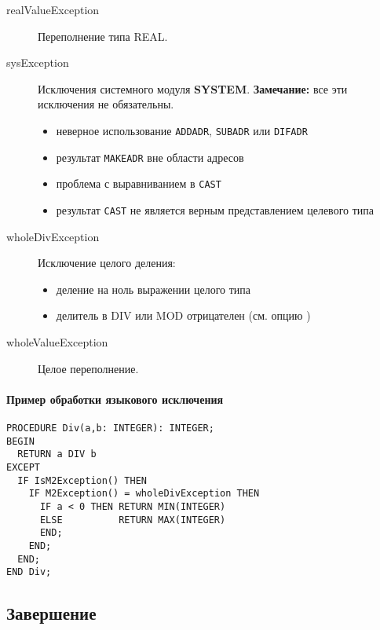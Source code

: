 \begin{description}
\item[realValueException] \mbox{}

Переполнение типа REAL.

\item[sysException] \mbox{}

        Исключения системного модуля {\bf SYSTEM}.
        {\bf Замечание:} все эти исключения не обязательны.
        \begin{itemize}
        \item неверное использование {\tt ADDADR}, {\tt SUBADR} или {\tt DIFADR}
        \item результат {\tt MAKEADR} вне области адресов
        \item проблема с выравниванием в {\tt CAST}
        \item результат {\tt CAST} не является верным представлением 
целевого типа
        \end{itemize}

\item[wholeDivException] \mbox{}

Исключение целого деления:
        \begin{itemize}
        \item деление на ноль выражении целого типа
        \item делитель в DIV или MOD отрицателен
              (см. опцию )
        \end{itemize}

\item[wholeValueException] \mbox{}

Целое переполнение.
\end{description}

\paragraph{Пример обработки языкового исключения}
\begin{verbatim}
PROCEDURE Div(a,b: INTEGER): INTEGER;
BEGIN
  RETURN a DIV b
EXCEPT
  IF IsM2Exception() THEN
    IF M2Exception() = wholeDivException THEN
      IF a < 0 THEN RETURN MIN(INTEGER)
      ELSE          RETURN MAX(INTEGER)
      END;
    END;
  END;
END Div;
\end{verbatim}

\subsection{Завершение}\label{m2:ISO:termination}

